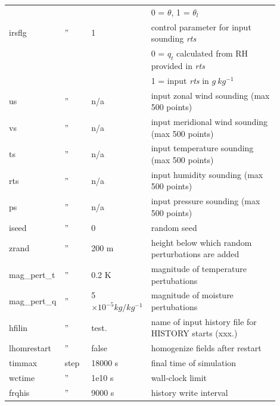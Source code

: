 \documentclass[11pt,a4paper]{article}
\begin{document}
\begin{longtable}[htb]{p{0.12\linewidth}p{0.1\linewidth}p{0.18\linewidth}p{0.5\linewidth}}
             &      &                     & \hspace{2mm} 0 = $\theta$, 1 = $\theta_l$             \\
irsflg       &  ''  & 1                   & control parameter for input sounding \textit{rts}     \\
             &      &                     & \hspace{2mm} 0 = $q_t$ calculated from RH provided in \textit{rts} \\
             &      &                     & \hspace{2mm} 1 = input \textit{rts} in $g \ kg^{-1}$  \\
us           &  ''  & n/a                 & input zonal wind sounding (max 500 points)            \\
vs           &  ''  & n/a                 & input meridional wind sounding (max 500 points)       \\
ts           &  ''  & n/a                 & input temperature sounding (max 500 points)           \\
rts          &  ''  & n/a                 & input humidity sounding (max 500 points)              \\
ps           &  ''  & n/a                 & input pressure sounding (max 500 points)              \\
iseed        &  ''  & 0                   & random seed                                           \\
zrand        &  ''  & 200 m               & height below which random perturbations are added     \\
mag\_pert\_t &  ''  & 0.2 K               & magnitude of temperature pertubations                 \\
mag\_pert\_q &  ''  & 5 $\times 10^{-5} kg / kg^{-1}$ & magnitude of moisture pertubations        \\
hfilin       &  ''  & test.               & name of input history file for HISTORY starts (xxx.)  \\
lhomrestart  &  ''  & false               & homogenize fields after restart                       \\
\hline
timmax       & step & 18000 s             & final time of simulation                              \\ 
wctime       &  ''  & 1e10 s              & wall-clock limit                                      \\
frqhis       &  ''  & 9000 s              & history write interval                                \\

\end{longtable}
\end{document}
